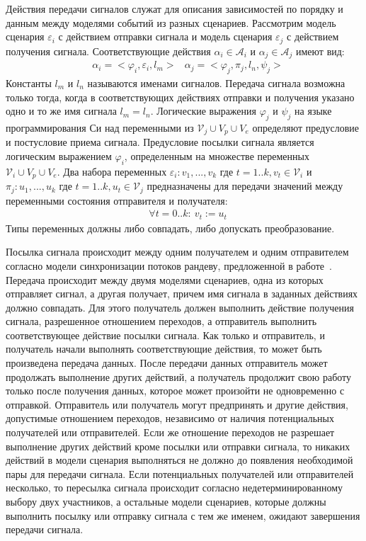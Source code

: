 Действия передачи сигналов служат для описания зависимостей по порядку и данным между моделями событий из разных сценариев.
Рассмотрим модель сценария $\varepsilon_i$ с действием отправки сигнала и модель сценария $\varepsilon_j$ с действием получения сигнала.
Соответствующие действия $\alpha_i \in \mathcal{A}_i$ и $\alpha_j \in \mathcal{A}_j$ имеют вид:
\begin{align*}
&\alpha_i = <\varphi_i, \varepsilon_i, l_m>
&\alpha_j = <\varphi_j, \pi_j, l_n, \psi_j>    
\end{align*}
Константы $l_m$ и $l_n$ называются именами сигналов.
Передача сигнала возможна только тогда, когда в соответствующих действиях отправки и получения указано одно и то же имя сигнала $l_m = l_n$.
Логические выражения $\varphi_j$ и $\psi_j$ на языке программирования Си над переменными из $\mathcal{V}_j \cup V_p \cup V_e$ определяют предусловие и постусловие приема сигнала.
Предусловие посылки сигнала является логическим выражением $\varphi_i$, определенным на множестве переменных $\mathcal{V}_i \cup V_p \cup V_e$.
Два набора переменных $\varepsilon_i: {v_1, ..., v_k}$ где $t = 1..k, v_t \in \mathcal{V}_i$ и $\pi_j: {u_1, ..., u_k}$ где $t = 1..k, u_t \in \mathcal{V}_j$ предназначены для передачи значений между переменными состояния отправителя и получателя:
\begin{align*}
&\forall t = 0..k:~v_t := u_t
\end{align*}
Типы переменных должны либо совпадать, либо допускать преобразование.

Посылка сигнала происходит между одним получателем и одним отправителем согласно модели синхронизации потоков рандеву, предложенной в работе~\cite{Hoare:1978:CSP}.
Передача происходит между двумя моделями сценариев, одна из которых отправляет сигнал, а другая получает, причем имя сигнала в заданных действиях должно совпадать.
Для этого получатель должен выполнить действие получения сигнала, разрешенное отношением переходов, а отправитель выполнить соответствующее действие посылки сигнала.
Как только и отправитель, и получатель начали выполнять соответствующие действия, то может быть произведена передача данных.
После передачи данных отправитель может продолжать выполнение других действий, а получатель продолжит свою работу только после получения данных, которое может произойти не одновременно с отправкой.
Отправитель или получатель могут предпринять и другие действия, допустимые отношением переходов, независимо от наличия потенциальных получателей или отправителей.
Если же отношение переходов не разрешает выполнение других действий кроме посылки или отправки сигнала, то никаких действий в модели сценария выполняться не должно до появления необходимой пары для передачи сигнала.
Если потенциальных получателей или отправителей несколько, то пересылка сигнала происходит согласно недетерминированному выбору двух участников, а остальные модели сценариев, которые должны выполнить посылку или отправку сигнала с тем же именем, ожидают завершения передачи сигнала.

